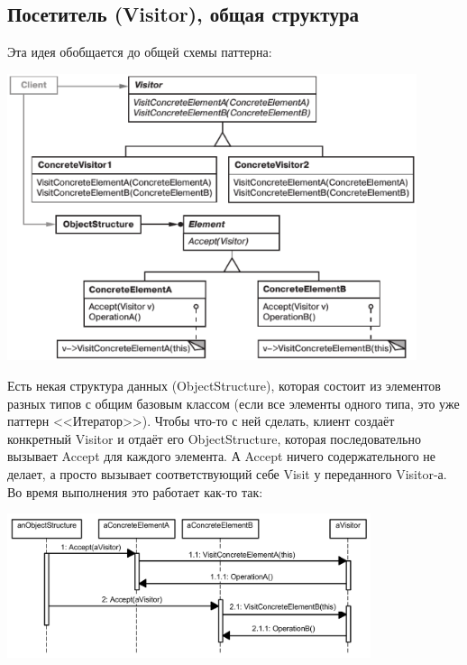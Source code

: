 \documentclass{../../text-style}
\begin{document}
\subsection{Посетитель (Visitor), общая структура}

Эта идея обобщается до общей схемы паттерна:

\begin{center}
    \includegraphics[width=0.9\textwidth]{visitor.png}
\end{center}

Есть некая структура данных (ObjectStructure), которая состоит из элементов разных типов с общим базовым классом (если все элементы одного типа, это уже паттерн <<Итератор>>). Чтобы что-то с ней сделать, клиент создаёт конкретный Visitor и отдаёт его ObjectStructure, которая последовательно вызывает Accept для каждого элемента. А Accept ничего содержательного не делает, а просто вызывает соответствующий себе Visit у переданного Visitor-а. Во время выполнения это работает как-то так:

\begin{center}
    \includegraphics[width=0.8\textwidth]{doubleDispatching.png}
\end{center}
\end{document}
